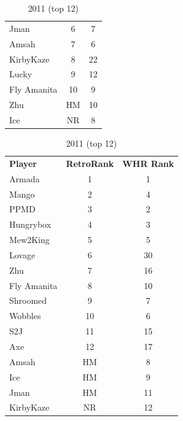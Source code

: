\documentclass[10pt]{article}
\theoremstyle{definition}
\theoremstyle{remark}
\begin{document}
\begin{table}[!ht]
{\begin{tabular}{lcc}
    Jman            & 6                      & 7        \\
    Amsah           & 7                      & 6        \\
    KirbyKaze       & 8                      & 22       \\
    Lucky           & 9                      & 12       \\
    Fly Amanita     & 10                     & 9        \\
    Zhu             & HM                     & 10       \\
    Ice             & NR                     & 8        \\
\end{tabular}
}
    \parbox{.33 \textwidth}{
        \centering
\caption{2011 (top 12)}
\begin{tabular}{lcc}
    \textbf{Player} & \textbf{RetroRank} & \textbf{WHR Rank} \\
    Armada          & 1                      & 1        \\
    Mango           & 2                      & 4        \\
    PPMD            & 3                      & 2        \\
    Hungrybox       & 4                      & 3        \\
    Mew2King        & 5                      & 5        \\
    Lovage          & 6                      & 30       \\
    Zhu             & 7                      & 16       \\
    Fly Amanita     & 8                      & 10       \\
    Shroomed        & 9                      & 7        \\
    Wobbles         & 10                     & 6        \\
    S2J             & 11                     & 15       \\
    Axe             & 12                     & 17       \\
    Amsah           & HM                     & 8        \\
    Ice             & HM                     & 9        \\
    Jman            & HM                     & 11       \\
    KirbyKaze       & NR                     & 12       \\
\end{tabular}
}
\end{table}
\end{document}
